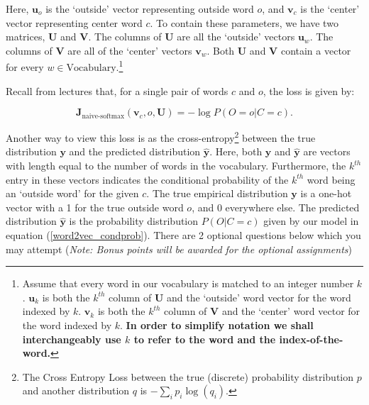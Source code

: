 Here, $\bm u_o$ is the `outside' vector representing outside word $o$, and $\bm v_c$ is the `center' vector representing center word $c$. 
To contain these parameters, we have two matrices, $\bm U$ and $\bm V$.
The columns of $\bm U$ are all the `outside' vectors $\bm u_{w}$. 
The columns of $\bm V$ are all of the `center' vectors $\bm v_{w}$. 
Both $\bm U$ and $\bm V$ contain a vector for every $w \in \text{Vocabulary}$.\footnote{Assume that every word in our vocabulary is matched to an integer number $k$.  $\bm u_{k}$ is both the $k^{th}$ column of $\bm U$ and the `outside' word vector for the word indexed by $k$. $\bm v_k$ is both the $k^{th}$ column of $\bm V$ and the `center' word vector for the word indexed by $k$. \textbf{In order to simplify notation we shall interchangeably use $k$ to refer to the word and the index-of-the-word.}}\newline

Recall from lectures that, for a single pair of words $c$ and $o$, the loss is given by:

\begin{equation} 
\bm J_{\text{naive-softmax}}(\bm v_c, o, \bm U) = -\log P(O=o \vert C=c).
\label{naive-softmax}
\end{equation}

Another way to view this loss is as the cross-entropy\footnote{The Cross Entropy Loss between the true (discrete) probability distribution $p$ and another distribution $q$ is $-\sum_i p_i \log(q_i)$.} between the true distribution $\bm y$ and the predicted distribution $\hat{\bm y}$. 
Here, both $\bm y$ and $\hat{\bm y}$ are vectors with length equal to the number of words in the vocabulary.
Furthermore, the $k^{th}$ entry in these vectors indicates the conditional probability of the $k^{th}$ word being an `outside word' for the given $c$. 
The true empirical distribution $\bm y$ is a one-hot vector with a 1 for the true outside word $o$, and 0 everywhere else. 
The predicted distribution $\hat{\bm y}$ is the probability distribution $P(O \vert C=c)$ given by our model in equation (\ref{word2vec_condprob}). There are 2 optional questions below which you may attempt (\emph{Note: Bonus points will be awarded for the optional assignments})

